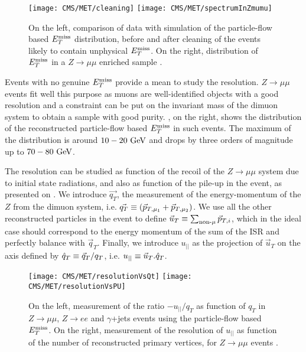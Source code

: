         \begin{figure}[h!]
            \centering
            \texttt{[image: CMS/MET/cleaning]}
            \texttt{[image: CMS/MET/spectrumInZmumu]}
            \caption{On the left, comparison of data with simulation of the
            particle-flow based $E_T^\text{miss}$ distribution, before and after cleaning of the events
            likely to contain unphysical $E_T^\text{miss}$. On the right, distribution of $E_T^\text{miss}$ in
            a $Z \rightarrow \mu\mu$ enriched sample \cite{METperf}. }
            \label{fig:METspectrum}
        \end{figure}

        Events with no genuine $E_T^\text{miss}$ provide a mean to study the resolution.
        $Z \rightarrow \mu\mu$ events fit well this purpose as muons are well-identified objects
        with a good resolution and a constraint can be put on the invariant mass of the
        dimuon system to obtain a sample with good purity. ,
        on the right, shows the distribution of the reconstructed particle-flow based
        $E_T^\text{miss}$ in such events. The maximum of the distribution is around $10-20~\text{GeV}$ and
        drops by three orders of magnitude up to $70-80~\text{GeV}$.

        The resolution can be studied as function of the recoil of the $Z \rightarrow \mu\mu$
        system due to initial state radiations, and also as function of the pile-up in the
        event, as presented on . We introduce $\vec{q_T}$,
        the measurement of the energy-momentum of the $Z$ from the dimuon system, i.e.
        $\vec{q_T} \equiv (\vec{p}_{T,\mu_1} + \vec{p}_{T,\mu_2})$. We use all the other
        reconstructed particles in the event to define $\vec{u}_T \equiv \sum_{\text{non-}\mu} \vec{p}_{T,i}$,
        which in the ideal case should correspond to the energy momentum of the sum of the
        ISR and perfectly balance with $\vec{q}_T$. Finally, we introduce $u_{||}$ as the
        projection of $\vec{u}_T$ on the axis defined by $\hat{q}_T \equiv \vec{q}_T
        / q_T$, i.e. $u_{||} \equiv \vec{u}_T . \hat{q}_T$.

        \begin{figure}[h!]
            \centering
            \texttt{[image: CMS/MET/resolutionVsQt]}
            \texttt{[image: CMS/MET/resolutionVsPU]}
            \caption{On the left, measurement of the ratio $-u_{||}/q_T$ as function of $q_T$
            in $Z\rightarrow\mu\mu$, $Z\rightarrow e e$ and $\gamma$+jets events using
            the particle-flow based $E_T^\text{miss}$. On the right, measurement of the resolution of
            $u_{||}$ as function of the number of reconstructed primary vertices, for
            $Z\rightarrow\mu\mu$ events \cite{METperf}.}
            \label{fig:METresolution}
        \end{figure}

